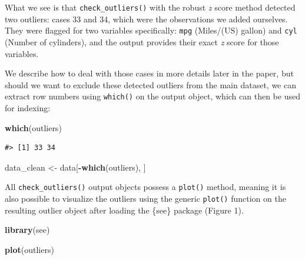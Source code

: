 \documentclass{article}
\newenvironment{Shaded}{\begin{snugshade}}{\end{snugshade}}
\newcommand{\FunctionTok}[1]{\textcolor[rgb]{0.13,0.29,0.53}{\textbf{#1}}}
\newcommand{\NormalTok}[1]{#1}
\newcommand{\OtherTok}[1]{\textcolor[rgb]{0.56,0.35,0.01}{#1}}
\newcommand{\SpecialCharTok}[1]{\textcolor[rgb]{0.81,0.36,0.00}{\textbf{#1}}}
\begin{document}
What we see is that \texttt{check\_outliers()} with the robust \emph{z}
score method detected two outliers: cases 33 and 34, which were the
observations we added ourselves. They were flagged for two variables
specifically: \texttt{mpg} (Miles/(US) gallon) and \texttt{cyl} (Number
of cylinders), and the output provides their exact \emph{z} score for
those variables.

We describe how to deal with those cases in more details later in the
paper, but should we want to exclude these detected outliers from the
main dataset, we can extract row numbers using \texttt{which()} on the
output object, which can then be used for indexing:

\begin{Shaded}
\begin{Highlighting}[]
\FunctionTok{which}\NormalTok{(outliers)}
\end{Highlighting}
\end{Shaded}

\begin{verbatim}
#> [1] 33 34
\end{verbatim}

\begin{Shaded}
\begin{Highlighting}[]
\NormalTok{data\_clean }\OtherTok{\textless{}{-}}\NormalTok{ data[}\SpecialCharTok{{-}}\FunctionTok{which}\NormalTok{(outliers), ]}
\end{Highlighting}
\end{Shaded}

All \texttt{check\_outliers()} output objects possess a \texttt{plot()}
method, meaning it is also possible to visualize the outliers using the
generic \texttt{plot()} function on the resulting outlier object after
loading the \{see\} package (Figure 1).

\begin{Shaded}
\begin{Highlighting}[]
\FunctionTok{library}\NormalTok{(see)}

\FunctionTok{plot}\NormalTok{(outliers)}
\end{Highlighting}
\end{Shaded}
\end{document}
